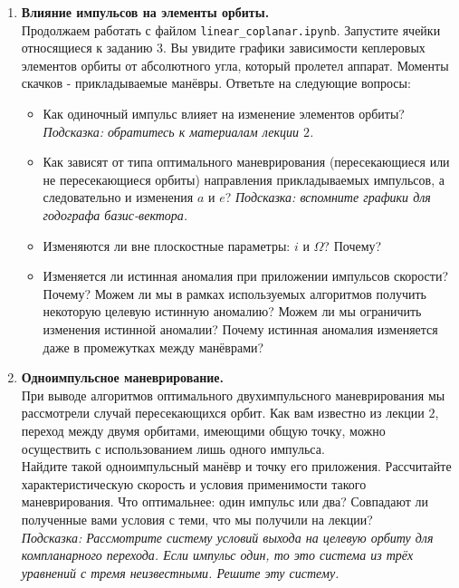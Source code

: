 \documentclass[12pt]{article}
\begin{document}
\begin{enumerate}
  \item \textbf{Влияние импульсов на элементы орбиты.} \\
  Продолжаем работать с файлом \texttt{linear\_coplanar.ipynb}. Запустите ячейки относящиеся к заданию $3$. Вы увидите графики зависимости кеплеровых элементов орбиты от абсолютного угла, который пролетел аппарат. Моменты скачков - прикладываемые манёвры. Ответьте на следующие вопросы:
  \begin{itemize}
      \item Как одиночный импульс влияет на изменение элементов орбиты? \textit{Подсказка: обратитесь к материалам лекции $2$.}
      
      \item Как зависят от типа оптимального маневрирования (пересекающиеся или не пересекающиеся орбиты) направления прикладываемых импульсов, а следовательно и изменения $a$ и $e$? \textit{Подсказка: вспомните графики для годографа базис-вектора.}

      \item Изменяются ли вне плоскостные параметры: $i$ и $\Omega$? Почему?

      \item Изменяется ли истинная аномалия при приложении импульсов скорости? Почему? Можем ли мы в рамках используемых алгоритмов получить некоторую целевую истинную аномалию? Можем ли мы ограничить изменения истинной аномалии? Почему истинная аномалия изменяется даже в промежутках между манёврами?
  \end{itemize}

  \item \textbf{Одноимпульсное маневрирование.} \\
  При выводе алгоритмов оптимального двухимпульсного маневрирования мы рассмотрели случай пересекающихся орбит. Как вам известно из лекции $2$, переход между двумя орбитами, имеющими общую точку, можно осуществить с использованием лишь одного импульса. \\ 
  Найдите такой одноимпульсный манёвр и точку его приложения. Рассчитайте характеристическую скорость и условия применимости такого маневрирования. Что оптимальнее: один импульс или два? Совпадают ли полученные вами условия с теми, что мы получили на лекции? \\
  \textit{Подсказка: Рассмотрите систему условий выхода на целевую орбиту для компланарного перехода. Если импульс один, то это система из трёх уравнений с тремя неизвестными. Решите эту систему.}


\end{enumerate}
\end{document}
